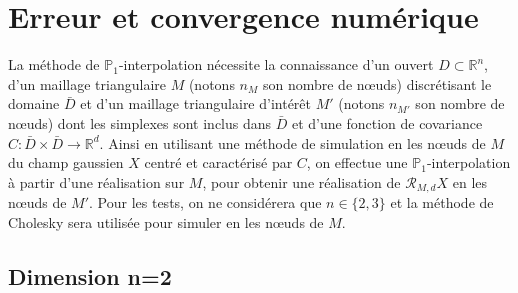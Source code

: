 \section{Erreur et convergence numérique}
\label{P1interpolConvErr}
La méthode de $\mathbb{P}_{1}$-interpolation nécessite la connaissance d'un ouvert $D \subset \mathbb{R}^n$, d'un maillage triangulaire
$M$ (notons $n_M$ son nombre de n\oe uds) discrétisant le domaine $\bar{D}$ et d'un maillage triangulaire d'intérêt $M'$ (notons $n_{M'}$ son nombre de n\oe uds)
dont les simplexes sont inclus dans $\bar{D}$ et d'une fonction de covariance $C: \bar{D} \times \bar{D} \rightarrow \mathbb{R}^{d}$.
Ainsi en utilisant une méthode de simulation en les n\oe uds
de $M$ du champ gaussien $X$ centré et caractérisé par $C$, on effectue une $\mathbb{P}_{1}$-interpolation à partir
d'une réalisation sur $M$, pour obtenir une réalisation de $\mathcal{R}_{M,d}X$ en les n\oe uds de $M'$.
Pour les tests, on ne considérera que $n \in \{2,3\}$ et la méthode de Cholesky sera utilisée pour simuler en les n\oe uds
de $M$.%

\subsection{Dimension n=2}

